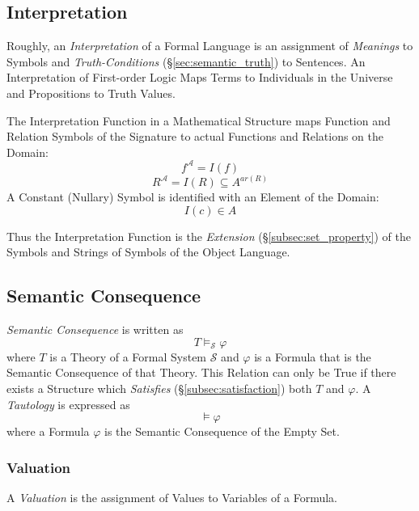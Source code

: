 \documentclass{article}
\begin{document}
\subsection{Interpretation}\label{subsec:interpretation}

Roughly, an \emph{Interpretation} of a Formal Language is an
assignment of \emph{Meanings} to Symbols and \emph{Truth-Conditions}
(\S\ref{sec:semantic_truth}) to Sentences. An Interpretation of
First-order Logic Maps Terms to Individuals in the Universe and
Propositions to Truth Values.

The Interpretation Function in a Mathematical Structure maps Function
and Relation Symbols of the Signature to actual Functions and
Relations on the Domain:
\[
    f^{\mathcal{A}} = I (f)
\]
\[
    R^{\mathcal{A}} = I (R) \subseteq A^{ar(R)}
\]
A Constant (Nullary) Symbol is identified with an Element of the
Domain:
\[
    I(c) \in A
\]

Thus the Interpretation Function is the \emph{Extension}
(\S\ref{subsec:set_property}) of the Symbols and Strings of Symbols of
the Object Language.

\subsection{Semantic Consequence}\label{subsec:semantic_consequence}

\emph{Semantic Consequence} is written as
\[
    T \vDash_{\mathcal{S}} \varphi
\]
where $T$ is a Theory of a Formal System $\mathcal{S}$ and $\varphi$
is a Formula that is the Semantic Consequence of that Theory. This
Relation can only be True if there exists a Structure which
\emph{Satisfies} (\S\ref{subsec:satisfaction}) both $T$ and
$\varphi$. A \emph{Tautology} is expressed as
\[
    \vDash {\varphi}
\]
where a Formula $\varphi$ is the Semantic Consequence of the Empty
Set.

\subsubsection{Valuation}\label{subsec:model_valuation}

A \emph{Valuation} is the assignment of Values to Variables of a
Formula.
\end{document}
